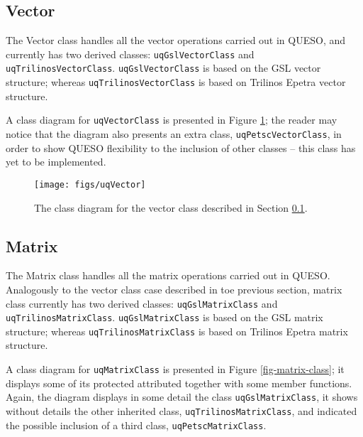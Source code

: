   

\subsection{Vector}\label{sec:vector_class}


The Vector class handles all the vector operations carried out in QUESO, and currently has two derived classes: \verb+uqGslVectorClass+ and \verb+uqTrilinosVectorClass+. \verb+uqGslVectorClass+ is based on the GSL vector structure; whereas \verb+uqTrilinosVectorClass+ is based on Trilinos Epetra vector structure.  

A class diagram for \verb+uqVectorClass+  is presented in Figure \ref{fig-vector-class}; the reader may notice that the diagram also presents an extra class, \verb+uqPetscVectorClass+, in order to show QUESO flexibility to the inclusion of other classes -- this class has yet to be implemented.


\begin{figure}[!htpb]
\centering
\texttt{[image: figs/uqVector]}
\vspace*{-8pt}
\caption{ The class diagram for the vector class described in Section \ref{sec:vector_class}.}
\label{fig-vector-class}
\end{figure}



\subsection{Matrix}\label{sec:matrix_class}



The Matrix class handles all the matrix operations carried out in QUESO.  Analogously to the vector class case described in toe previous section,
matrix class currently has two derived classes: \verb+uqGslMatrixClass+ and \verb+uqTrilinosMatrixClass+. \verb+uqGslMatrixClass+ is based on the GSL matrix structure; whereas \verb+uqTrilinosMatrixClass+ is based on Trilinos Epetra matrix structure.

A class diagram for \verb+uqMatrixClass+  is presented in Figure \ref{fig-matrix-class}; it displays some of its protected attributed together with  some member functions. Again, the diagram displays in some detail the class \verb+uqGslMatrixClass+, it shows without details the other inherited class, \verb+uqTrilinosMatrixClass+, and indicated the possible inclusion of a third class, \verb+uqPetscMatrixClass+.




